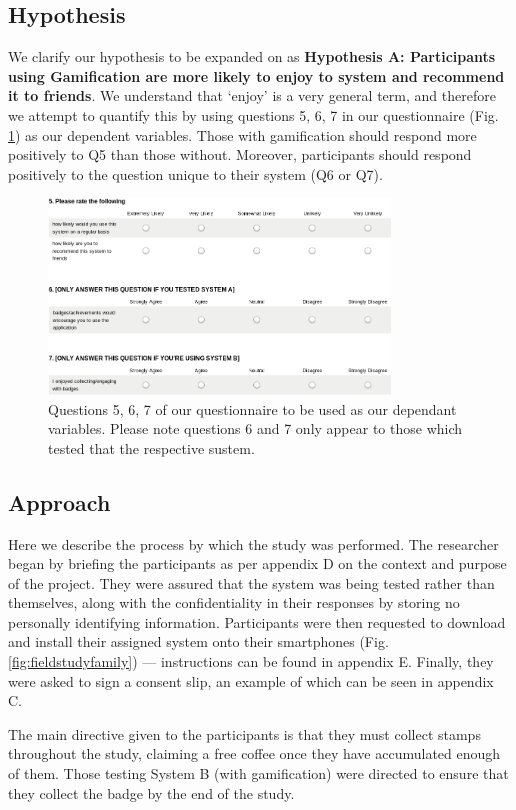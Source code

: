 \subsection{Hypothesis}
\label{hypothesis}
We clarify our hypothesis to be expanded on as \textbf{Hypothesis A: Participants using Gamification are more likely to enjoy to system and recommend it to friends}. We understand that `enjoy' is a very general term, and therefore we attempt to quantify this by using questions 5, 6, 7 in our questionnaire (Fig. \ref{fig:questionz}) as our dependent variables. Those with gamification should respond more positively to Q5 than those without. Moreover, participants should respond positively to the question unique to their system (Q6 or Q7).
\begin{figure}[H]
 \centering
  \includegraphics[width=0.81\textwidth]{img/questions.png}
     \caption{Questions 5, 6, 7 of our questionnaire to be used as our dependant variables. Please note questions 6 and 7 only appear to those which tested that the respective sustem.}
     \label{fig:questionz}
\end{figure}
\subsection{Approach}
Here we describe the process by which the study was performed. The researcher began by briefing the participants as per appendix D on the context and purpose of the project. They were assured that the system was being tested rather than themselves, along with the confidentiality in their responses by storing no personally identifying information. Participants were then requested to download and install their assigned system onto their smartphones (Fig. \ref{fig:fieldstudyfamily}) --- instructions can be found in appendix E. Finally, they were asked to sign a consent slip, an example of which can be seen in appendix C.

The main directive given to the participants is that they must collect stamps throughout the study, claiming a free coffee once they have accumulated enough of them. Those testing System B (with gamification) were directed to ensure that they collect the badge by the end of the study.

